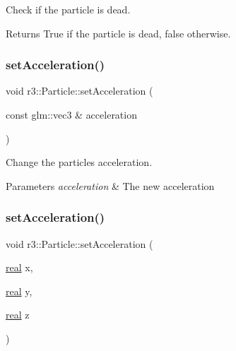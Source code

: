 Check if the particle is dead. 

\begin{DoxyReturn}{Returns}
True if the particle is dead, false otherwise. 
\end{DoxyReturn}
\mbox{\label{classr3_1_1_particle_ad4c180ad74ee8cfd1b0e5c76347d6182}} 
\subsubsection{\texorpdfstring{set\+Acceleration()}{setAcceleration()}\hspace{0.1cm}{\footnotesize\ttfamily [1/2]}}
{\footnotesize\ttfamily void r3\+::\+Particle\+::set\+Acceleration (\begin{DoxyParamCaption}\item[{const glm\+::vec3 \&}]{acceleration }\end{DoxyParamCaption})}



Change the particle\textquotesingle{}s acceleration. 


\begin{DoxyParams}{Parameters}
{\em acceleration} & The new acceleration \\
\hline
\end{DoxyParams}
\mbox{\label{classr3_1_1_particle_a4043de464de32d14d8db0f676f63da75}} 
\subsubsection{\texorpdfstring{set\+Acceleration()}{setAcceleration()}\hspace{0.1cm}{\footnotesize\ttfamily [2/2]}}
{\footnotesize\ttfamily void r3\+::\+Particle\+::set\+Acceleration (\begin{DoxyParamCaption}\item[{\mbox{\hyperlink{namespacer3_ab2016b3e3f743fb735afce242f0dc1eb}{real}}}]{x,  }\item[{\mbox{\hyperlink{namespacer3_ab2016b3e3f743fb735afce242f0dc1eb}{real}}}]{y,  }\item[{\mbox{\hyperlink{namespacer3_ab2016b3e3f743fb735afce242f0dc1eb}{real}}}]{z }\end{DoxyParamCaption})}



